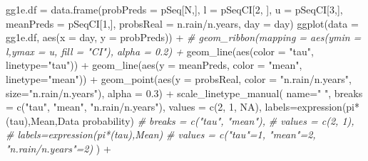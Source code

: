 \documentclass[
]{article}
\newenvironment{Shaded}{\begin{snugshade}}{\end{snugshade}}
\newcommand{\AttributeTok}[1]{\textcolor[rgb]{0.77,0.63,0.00}{#1}}
\newcommand{\CommentTok}[1]{\textcolor[rgb]{0.56,0.35,0.01}{\textit{#1}}}
\newcommand{\ConstantTok}[1]{\textcolor[rgb]{0.00,0.00,0.00}{#1}}
\newcommand{\DecValTok}[1]{\textcolor[rgb]{0.00,0.00,0.81}{#1}}
\newcommand{\FloatTok}[1]{\textcolor[rgb]{0.00,0.00,0.81}{#1}}
\newcommand{\FunctionTok}[1]{\textcolor[rgb]{0.00,0.00,0.00}{#1}}
\newcommand{\NormalTok}[1]{#1}
\newcommand{\OtherTok}[1]{\textcolor[rgb]{0.56,0.35,0.01}{#1}}
\newcommand{\SpecialCharTok}[1]{\textcolor[rgb]{0.00,0.00,0.00}{#1}}
\newcommand{\StringTok}[1]{\textcolor[rgb]{0.31,0.60,0.02}{#1}}
\begin{document}
\begin{Shaded}
\begin{Highlighting}[]
\NormalTok{gg1e.df }\OtherTok{=} \FunctionTok{data.frame}\NormalTok{(}\AttributeTok{probPreds =}\NormalTok{ pSeq[N,], }\AttributeTok{l =}\NormalTok{ pSeqCI[}\DecValTok{2}\NormalTok{, ], }\AttributeTok{u =}\NormalTok{ pSeqCI[}\DecValTok{3}\NormalTok{,],}
                     \AttributeTok{meanPreds =}\NormalTok{ pSeqCI[}\DecValTok{1}\NormalTok{,], }\AttributeTok{probsReal =}\NormalTok{ n.rain}\SpecialCharTok{/}\NormalTok{n.years, }
                     \AttributeTok{day =}\NormalTok{ day)}
\FunctionTok{ggplot}\NormalTok{(}\AttributeTok{data =}\NormalTok{ gg1e.df, }\FunctionTok{aes}\NormalTok{(}\AttributeTok{x =}\NormalTok{ day, }\AttributeTok{y =}\NormalTok{ probPreds)) }\SpecialCharTok{+} 
  \CommentTok{\# geom\_ribbon(mapping = aes(ymin = l,ymax = u, fill = "CI"), alpha = 0.2) +}
  \FunctionTok{geom\_line}\NormalTok{(}\FunctionTok{aes}\NormalTok{(}\AttributeTok{color =} \StringTok{"tau"}\NormalTok{, }\AttributeTok{linetype=}\StringTok{"tau"}\NormalTok{)) }\SpecialCharTok{+}
  \FunctionTok{geom\_line}\NormalTok{(}\FunctionTok{aes}\NormalTok{(}\AttributeTok{y =}\NormalTok{ meanPreds, }\AttributeTok{color =} \StringTok{"mean"}\NormalTok{, }\AttributeTok{linetype=}\StringTok{"mean"}\NormalTok{)) }\SpecialCharTok{+}
  \FunctionTok{geom\_point}\NormalTok{(}\FunctionTok{aes}\NormalTok{(}\AttributeTok{y =}\NormalTok{ probsReal, }\AttributeTok{color =} \StringTok{"n.rain/n.years"}\NormalTok{,}
                \AttributeTok{size=}\StringTok{"n.rain/n.years"}\NormalTok{), }\AttributeTok{alpha =} \FloatTok{0.3}\NormalTok{) }\SpecialCharTok{+} 
  \FunctionTok{scale\_linetype\_manual}\NormalTok{(}
    \AttributeTok{name=}\StringTok{" "}\NormalTok{,}
    \AttributeTok{breaks =} \FunctionTok{c}\NormalTok{(}\StringTok{"tau"}\NormalTok{, }\StringTok{"mean"}\NormalTok{, }\StringTok{"n.rain/n.years"}\NormalTok{),}
    \AttributeTok{values =} \FunctionTok{c}\NormalTok{(}\DecValTok{2}\NormalTok{, }\DecValTok{1}\NormalTok{, }\ConstantTok{NA}\NormalTok{),}
    \AttributeTok{labels=}\FunctionTok{expression}\NormalTok{(pi}\SpecialCharTok{*}\NormalTok{(tau),}\StringTok{\textquotesingle{}Mean\textquotesingle{}}\NormalTok{,}\StringTok{\textquotesingle{}Data probability\textquotesingle{}}\NormalTok{)}
    \CommentTok{\# breaks = c("tau", "mean"),}
    \CommentTok{\# values = c(2, 1),}
    \CommentTok{\# labels=expression(pi*(tau),\textquotesingle{}Mean\textquotesingle{})}
    \CommentTok{\# values = c("tau"=1, "mean"=2, "n.rain/n.years"=2)}
\NormalTok{  ) }\SpecialCharTok{+}

\end{Highlighting}
\end{Shaded}
\end{document}
